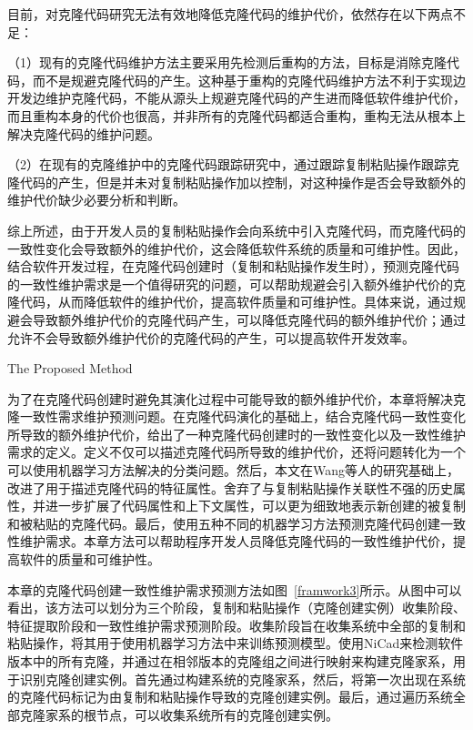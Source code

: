 目前，对克隆代码研究无法有效地降低克隆代码的维护代价，依然存在以下两点不足：

（1）现有的克隆代码维护方法主要采用先检测后重构的方法，目标是消除克隆代码，而不是规避克隆代码的产生。这种基于重构的克隆代码维护方法不利于实现边开发边维护克隆代码，不能从源头上规避克隆代码的产生进而降低软件维护代价，而且重构本身的代价也很高，并非所有的克隆代码都适合重构，重构无法从根本上解决克隆代码的维护问题。

（2）在现有的克隆维护中的克隆代码跟踪研究中，通过跟踪复制粘贴操作跟踪克隆代码的产生，但是并未对复制粘贴操作加以控制，对这种操作是否会导致额外的维护代价缺少必要分析和判断。

综上所述，由于开发人员的复制粘贴操作会向系统中引入克隆代码，而克隆代码的一致性变化会导致额外的维护代价，这会降低软件系统的质量和可维护性。因此，结合软件开发过程，在克隆代码创建时（复制和粘贴操作发生时），预测克隆代码的一致性维护需求是一个值得研究的问题，可以帮助规避会引入额外维护代价的克隆代码，从而降低软件的维护代价，提高软件质量和可维护性。具体来说，通过规避会导致额外维护代价的克隆代码产生，可以降低克隆代码的额外维护代价；通过允许不会导致额外维护代价的克隆代码的产生，可以提高软件开发效率。

{The Proposed Method}

为了在克隆代码创建时避免其演化过程中可能导致的额外维护代价，本章将解决克隆一致性需求维护预测问题。在克隆代码演化的基础上，结合克隆代码一致性变化所导致的额外维护代价，给出了一种克隆代码创建时的一致性变化以及一致性维护需求的定义。定义不仅可以描述克隆代码所导致的维护代价，还将问题转化为一个可以使用机器学习方法解决的分类问题。然后，本文在Wang\cite{wang2014predicting}等人的研究基础上，改进了用于描述克隆代码的特征属性。舍弃了与复制粘贴操作关联性不强的历史属性，并进一步扩展了代码属性和上下文属性，可以更为细致地表示新创建的被复制和被粘贴的克隆代码。最后，使用五种不同的机器学习方法预测克隆代码创建一致性维护需求。本章方法可以帮助程序开发人员降低克隆代码的一致性维护代价，提高软件的质量和可维护性。

本章的克隆代码创建一致性维护需求预测方法如图~\ref{framwork3}所示。从图中可以看出，该方法可以划分为三个阶段，复制和粘贴操作（克隆创建实例）收集阶段、特征提取阶段和一致性维护需求预测阶段。收集阶段旨在收集系统中全部的复制和粘贴操作，将其用于使用机器学习方法中来训练预测模型。使用NiCad来检测软件版本中的所有克隆，并通过在相邻版本的克隆组之间进行映射来构建克隆家系，用于识别克隆创建实例。首先通过构建系统的克隆家系，然后，将第一次出现在系统的克隆代码标记为由复制和粘贴操作导致的克隆创建实例。最后，通过遍历系统全部克隆家系的根节点，可以收集系统所有的克隆创建实例。

